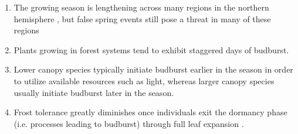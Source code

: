 \documentclass{article}\usepackage[]{graphicx}\usepackage[]{color}
\begin{document}
\begin{enumerate}
\item The growing season is lengthening across many regions in the northern hemisphere \citep{Chen2005, Liu2006, Kukal2018}, but false spring events still pose a threat in many of these regions \citep{Wypych2016a}


\item Plants growing in forest systems tend to exhibit staggered days of budburst.
\item Lower canopy species typically initiate budburst earlier in the season in order to utilize available resources such as light, whereas larger canopy species usually initiate budburst later in the season.

\item Frost tolerance greatly diminishes once individuals exit the dormancy phase (i.e. processes leading to budburst) through full leaf expansion \citep{Vitasse2014}.
\end{enumerate}
\end{document}
